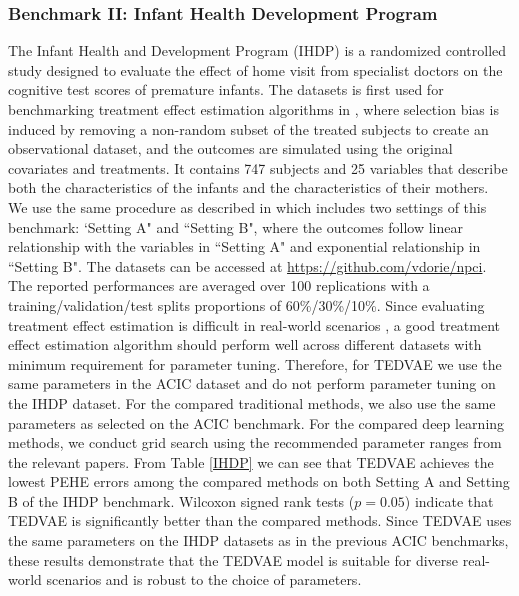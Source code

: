 \documentclass[letterpaper]{article} %
\begin{document}
\subsubsection{Benchmark II: Infant Health Development Program}
The Infant Health and Development Program (IHDP) is a randomized controlled study designed to evaluate the effect of home visit from specialist doctors on the cognitive test scores of premature infants.
The datasets is first used for benchmarking treatment effect estimation algorithms in \cite{Hill2011}, where selection bias is induced by removing a non-random subset of the treated subjects to create an observational dataset, and the outcomes are simulated using the original covariates and treatments.
It contains 747 subjects and 25 variables that describe both the characteristics of the infants and the characteristics of their mothers.
We use the same procedure as described in \cite{Hill2011} which includes two settings of this benchmark: `Setting A" and ``Setting B", where the outcomes follow linear relationship with the variables in ``Setting A" and exponential relationship in ``Setting B". The datasets can be accessed at \url{https://github.com/vdorie/npci}.
The reported performances are averaged over 100 replications with a training/validation/test splits proportions of 60\%/30\%/10\%.  Since evaluating treatment effect estimation is difficult in real-world scenarios \cite{Alaa2019}, a good treatment effect estimation algorithm should perform well across different datasets with minimum requirement for parameter tuning.
Therefore, for TEDVAE we use the same parameters in the ACIC dataset and do not perform parameter tuning on the IHDP dataset.
For the compared traditional methods, we also use the same parameters as selected on the ACIC benchmark. For the compared deep learning methods, we conduct grid search using the recommended parameter ranges from the relevant papers.  From Table \ref{IHDP} we can see that TEDVAE achieves the lowest PEHE errors among the compared methods on both Setting A and Setting B of the IHDP benchmark. Wilcoxon signed rank tests ($p=0.05$) indicate that TEDVAE is significantly better than the compared methods.
Since TEDVAE uses the same parameters on the IHDP datasets as in the previous ACIC benchmarks,  these results demonstrate that the TEDVAE model is suitable for diverse real-world scenarios and is robust to the choice of parameters.
\end{document}
